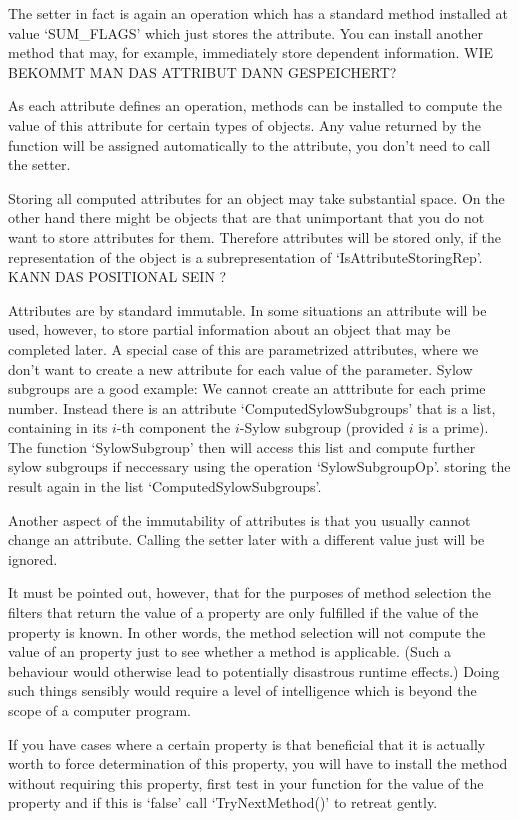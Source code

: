 \danger
The setter in fact is again an operation which has a standard method
installed at value `SUM_FLAGS' which just stores the attribute. You can
install another method that may, for example, immediately store
dependent information. WIE BEKOMMT MAN DAS ATTRIBUT DANN GESPEICHERT?

As each attribute defines an operation, methods can be installed to compute 
the value of this attribute for certain types of objects. Any value returned
by the function will be assigned automatically to the attribute, you don't
need to call the setter.

\danger
Storing all computed attributes for an object may take substantial space. On
the other hand there might be objects that are that unimportant that you
do not want to store attributes for them. Therefore attributes will be
stored only, if the representation of the object is a subrepresentation of
`IsAttributeStoringRep'. KANN DAS POSITIONAL SEIN ?

\danger
Attributes are by standard immutable. In some situations an attribute will
be used, however, to store partial information about an object that may be
completed later. A special case of this are parametrized attributes, where
we don't want to create a new attribute for each value of the parameter.
Sylow subgroups are a good example: We cannot create an atttribute for each
prime number. Instead there is an attribute `ComputedSylowSubgroups' that is
a list, containing in its $i$-th component the $i$-Sylow subgroup (provided
$i$ is a prime). The function `SylowSubgroup' then will access this list and
compute further sylow subgroups if neccessary using the operation
`SylowSubgroupOp'. storing the result again in the list
`ComputedSylowSubgroups'.


\danger
Another aspect of the immutability of attributes is that you usually cannot
change an attribute. Calling the setter later with a different value just
will be ignored.


\danger
It must be pointed out, however, that for the purposes of method selection
the filters that return the value of a property are only fulfilled if the
value of the property is known. In other words, the method selection will
not compute the value of an property just to see whether a method is
applicable. (Such a behaviour would otherwise lead to potentially disastrous
runtime effects.) Doing such things sensibly would require a level of
intelligence which is beyond the scope of a computer program. 

\danger
If you have cases where a certain property is that beneficial that
it is actually worth to force determination of this property, you will have
to install the method without requiring this property, first test in your
function for the value of the property and if this is `false' call
`TryNextMethod()' to retreat gently.

